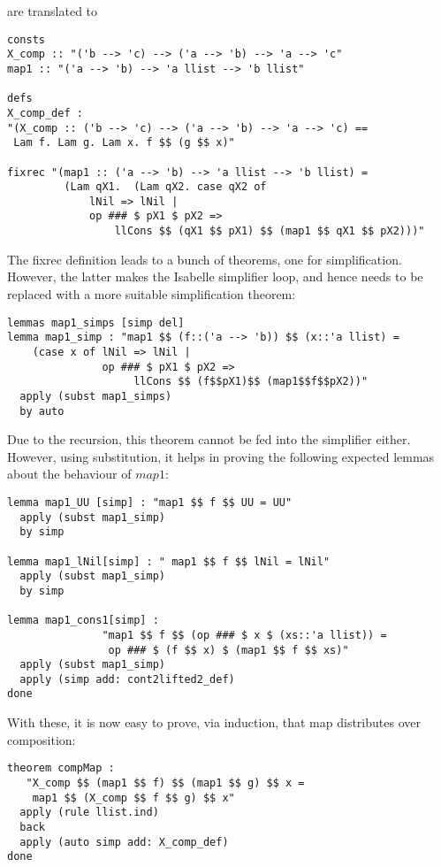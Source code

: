 \documentclass{llncs}
\begin{document}
\noindent 
are translated to

\begin{verbatim}
consts
X_comp :: "('b --> 'c) --> ('a --> 'b) --> 'a --> 'c"
map1 :: "('a --> 'b) --> 'a llist --> 'b llist"

defs
X_comp_def :
"(X_comp :: ('b --> 'c) --> ('a --> 'b) --> 'a --> 'c) ==
 Lam f. Lam g. Lam x. f $$ (g $$ x)"

fixrec "(map1 :: ('a --> 'b) --> 'a llist --> 'b llist) =
         (Lam qX1.  (Lam qX2. case qX2 of
             lNil => lNil |
             op ### $ pX1 $ pX2 =>
                 llCons $$ (qX1 $$ pX1) $$ (map1 $$ qX1 $$ pX2)))"
\end{verbatim}


\noindent 
The fixrec definition leads to a bunch of theorems, one for simplification.
However, the latter makes the Isabelle simplifier loop, and hence needs
to be replaced with a more suitable simplification theorem:
\begin{verbatim}
lemmas map1_simps [simp del]
lemma map1_simp : "map1 $$ (f::('a --> 'b)) $$ (x::'a llist) =
    (case x of lNil => lNil | 
               op ### $ pX1 $ pX2 => 
                    llCons $$ (f$$pX1)$$ (map1$$f$$pX2))"
  apply (subst map1_simps)
  by auto
\end{verbatim}

\noindent 
Due to the recursion, this theorem cannot be fed into the simplifier either.
However, using substitution, it helps in proving the following
expected lemmas about the behaviour of $map1$:

\begin{verbatim}
lemma map1_UU [simp] : "map1 $$ f $$ UU = UU"
  apply (subst map1_simp) 
  by simp

lemma map1_lNil[simp] : " map1 $$ f $$ lNil = lNil"
  apply (subst map1_simp) 
  by simp

lemma map1_cons1[simp] : 
               "map1 $$ f $$ (op ### $ x $ (xs::'a llist)) =
                op ### $ (f $$ x) $ (map1 $$ f $$ xs)"
  apply (subst map1_simp)
  apply (simp add: cont2lifted2_def)
done
\end{verbatim}

\noindent With these, it is now easy to prove, via induction, that map
distributes over composition:
\begin{verbatim}
theorem compMap : 
   "X_comp $$ (map1 $$ f) $$ (map1 $$ g) $$ x = 
    map1 $$ (X_comp $$ f $$ g) $$ x"
  apply (rule llist.ind)
  back
  apply (auto simp add: X_comp_def)
done
\end{verbatim}
\end{document}
